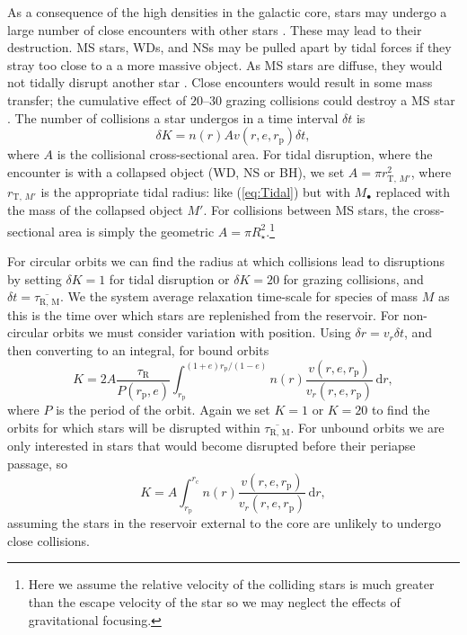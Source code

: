 \documentclass[useAMS,usedcolumn,usegraphicx,usenatbib]{mn2e}
\newcommand{\eqnref}[1]{(\ref{eq:#1})}
\newcommand{\sub}[1]{\ensuremath{_\mathrm{#1}}}
\newcommand{\dd}{\ensuremath{\mathrm{d}}}
\newcommand{\intd}[4]{\ensuremath{\displaystyle \int_{#1}^{#2}{#3}\,\dd{#4}}}
\begin{document}
As a consequence of the high densities in the galactic core, stars may undergo a large number of close encounters with other stars \citep{Cohn1978}. These may lead to their destruction. MS stars, WDs, and NSs may be pulled apart by tidal forces if they stray too close to a a more massive object. As MS stars are diffuse, they would not tidally disrupt another star \citep{Murphy1991,Freitag2005}. Close encounters would result in some mass transfer; the cumulative effect of $20$--$30$ grazing collisions could destroy a MS star \citep{Freitag2006}. The number of collisions a star undergos in a time interval $\delta t$ is
\begin{equation}
\delta K = n(r) A v(r,e,r\sub{p})\delta t,
\end{equation}
where $A$ is the collisional cross-sectional area. For tidal disruption, where the encounter is with a collapsed object (WD, NS or BH), we set $A = \pi r_{\mathrm{T},\,{M'}}^2$, where $r_{\mathrm{T},\,{M'}}$ is the appropriate tidal radius: like \eqnref{Tidal} but with $M_\bullet$ replaced with the mass of the collapsed object $M'$. For collisions between MS stars, the cross-sectional area is simply the geometric $A = \pi R_\star^2$.\footnote{Here we assume the relative velocity of the colliding stars is much greater than the escape velocity of the star so we may neglect the effects of gravitational focusing.}

For circular orbits we can find the radius at which collisions lead to disruptions by setting $\delta K = 1$ for tidal disruption or $\delta K = 20$ for grazing collisions, and $\delta t = \overline{\tau_\mathrm{R,\,M}}$. We the system average relaxation time-scale for species of mass $M$ as this is the time over which stars are replenished from the reservoir. For non-circular orbits we must consider variation with position. Using $\delta r = v_r \delta t$, and then converting to an integral, for bound orbits
\begin{equation}
K = 2 A \frac{\tau\sub{R}}{P(r\sub{p},e)}\intd{r\sub{p}}{(1+e)r\sub{p}/(1-e)}{n(r)\frac{v(r,e,r\sub{p})}{v_r(r,e,r\sub{p})}}{r},
\end{equation}
where $P$ is the period of the orbit. Again we set $K = 1$ or $K = 20$ to find the orbits for which stars will be disrupted within $\overline{\tau_\mathrm{R,\,M}}$. For unbound orbits we are only interested in stars that would become disrupted before their periapse passage, so
\begin{equation}
K = A \intd{r\sub{p}}{r\sub{c}}{n(r)\frac{v(r,e,r\sub{p})}{v_r(r,e,r\sub{p})}}{r},
\end{equation}
assuming the stars in the reservoir external to the core are unlikely to undergo close collisions.
\end{document}
